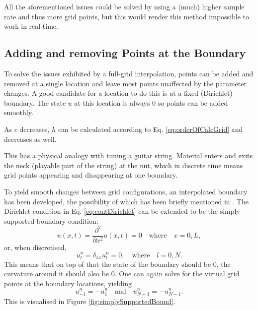 \documentclass[dvipsnames, reprint]{JASA}
\begin{document}
All the aforementioned issues could be solved by using a (much) higher sample rate and thus more grid points, but this would render this method impossible to work in real time.

\subsection{Adding and removing Points at the Boundary}\label{sec:addAtBoundary}
To solve the issues exhibited by a full-grid interpolation, points can be added and removed at a single location and leave most points unaffected by the parameter changes. A good candidate for a location to do this is at a fixed (Dirichlet) boundary. The state $u$ at this location is always $0$ so points can be added smoothly. 

As $c$ decreases, $h$ can be calculated according to Eq. \eqref{eq:orderOfCalcGrid} and decreases as well.

This has a physical analogy with tuning a guitar string. Material enters and exits the neck (playable part of the string) at the nut, which in discrete time means grid points appearing and disappearing at one boundary.

To yield smooth changes between grid configurations, an interpolated boundary has been developed, the possibility of which has been briefly mentioned in \cite[p. 145]{bilbao2009}. The Dirichlet condition in Eq. \eqref{eq:contDirichlet} can be extended to be the simply supported boundary condition:
\begin{equation}
    u(x, t) = \frac{\partial^2}{\partial x^2}u(x, t) = 0 \quad \text{where} \quad x = 0, L,
\end{equation}
or, when discretised,
\begin{equation}\label{eq:simplySupportedDiscrete}
    u_l^n = \delta_{xx}u_l^n = 0, \quad \text{where} \quad l = 0, N.
\end{equation}
This means that on top of that the state of the boundary should be $0$, the curvature around it should also be $0$. One can again solve for the virtual grid points at the boundary locations, yielding
\begin{equation}
    u_{-1}^n = -u_1^n \quad \text{and} \quad u_{N+1}^n = -u_{N-1}^n.
\end{equation}
This is visualised in Figure \ref{fig:simplySupportedBound}.
\end{document}
